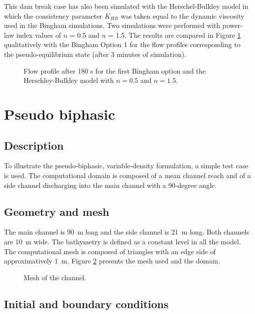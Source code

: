 This dam break case has also been simulated with the Herschel-Bulkley model in
which the consistency parameter $K_{HB}$ was taken equal to the dynamic
viscosity used in the Bingham simulations.
Two simulations were performed with power-law index values of $n$ = 0.5 and
$n$ = 1.5.
The results are compared in Figure \ref{nnnewt:profilehb} qualitatively with the
Bingham Option 1 for the flow profiles corresponding to the pseudo-equilibrium
state (after 3 minutes of simulation).

\begin{figure}[!htbp]
 \centering
 \caption{Flow profile after 180 s for the first Bingham option and the Herschley-Bulkley model with $n=0.5$ and $n=1.5$.}
 \label{nnnewt:profilehb}
\end{figure}

\section{Pseudo biphasic}

\subsection{Description}

To illustrate the pseudo-biphasic, variable-density formulation, a simple test
case is used.
The computational domain is composed of a mean channel reach and of a side
channel discharging into the main channel with a 90-degree angle.

\subsection{Geometry and mesh}

The main channel is 90~m long and the side channel is 21~m long.
Both channels are 10~m wide.
The bathymetry is defined as a constant level in all the model.
The computational mesh is composed of triangles with an edge side of
approximatively 1~m.
Figure \ref{pseudo-biphasic:mesh} presents the mesh used and the domain.

\begin{figure}[!htbp]
 \centering
 \caption{Mesh of the channel.}
 \label{pseudo-biphasic:mesh}
\end{figure}

\subsection{Initial and boundary conditions}

